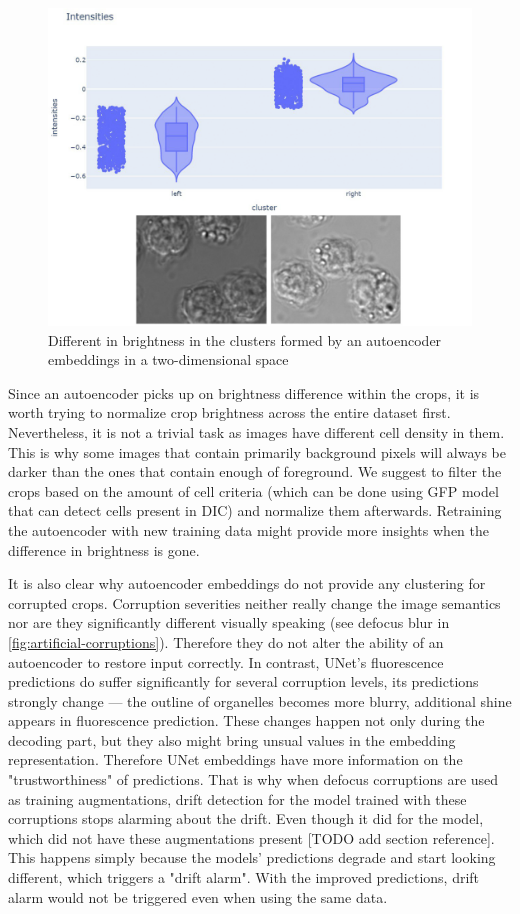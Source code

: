 \begin{figure}[H]
	\begin{center}
		\includegraphics[width=0.5\linewidth]{bilder/ae-embeddings/brighter-darker.png}
		\caption{Different in brightness in the clusters formed by an autoencoder embeddings in a two-dimensional space}
		\label{fig:ae-brighter-darker}
	\end{center}
\end{figure}

Since an autoencoder picks up on brightness difference within the crops, it is worth trying to normalize crop brightness across the entire dataset first. Nevertheless, it is not a trivial task as images have different cell density in them. This is why some images that contain primarily background pixels will always be darker than the ones that contain enough of foreground. We suggest to filter the crops based on the amount of cell criteria (which can be done using GFP model that can detect cells present in DIC) and normalize them afterwards. Retraining the autoencoder with new training data might provide more insights when the difference in brightness is gone.

It is also clear why autoencoder embeddings do not provide any clustering for corrupted crops. Corruption severities neither really change the image semantics nor are they significantly different visually speaking (see defocus blur in \ref{fig:artificial-corruptions}). Therefore they do not alter the ability of an autoencoder to restore input correctly. In contrast, UNet's fluorescence predictions do suffer significantly for several corruption levels, its predictions strongly change --- the outline of organelles becomes more blurry, additional shine appears in fluorescence prediction. These changes happen not only during the decoding part, but they also might bring unsual values in the embedding representation. Therefore UNet embeddings have more information on the "trustworthiness" of predictions. That is why when defocus corruptions are used as training augmentations, drift detection for the model trained with these corruptions stops alarming about the drift. Even though it did for the model, which did not have these augmentations present [TODO add section reference]. This happens simply because the models' predictions degrade and start looking different, which triggers a "drift alarm". With the improved predictions, drift alarm would not be triggered even when using the same data.